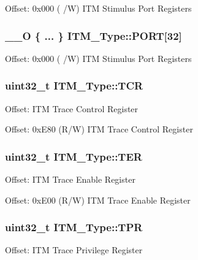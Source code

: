 Offset\-: 0x000 ( /\-W) I\-T\-M Stimulus Port Registers \hypertarget{struct_i_t_m___type_a98d0116d15de5f5633d34fdf594b853e}{
\subsubsection[{P\-O\-R\-T}]{\setlength{\rightskip}{0pt plus 5cm}\-\_\-\-\_\-\-O \{ ... \}    I\-T\-M\-\_\-\-Type\-::\-P\-O\-R\-T\mbox{[}32\mbox{]}}}\label{struct_i_t_m___type_a98d0116d15de5f5633d34fdf594b853e}
Offset\-: 0x000 ( /\-W) I\-T\-M Stimulus Port Registers \hypertarget{struct_i_t_m___type_a58f169e1aa40a9b8afb6296677c3bb45}{
\subsubsection[{T\-C\-R}]{ uint32\-\_\-t I\-T\-M\-\_\-\-Type\-::\-T\-C\-R}}\label{struct_i_t_m___type_a58f169e1aa40a9b8afb6296677c3bb45}
Offset\-: I\-T\-M Trace Control Register

Offset\-: 0x\-E80 (R/\-W) I\-T\-M Trace Control Register \hypertarget{struct_i_t_m___type_a91a040e1b162e1128ac1e852b4a0e589}{
\subsubsection[{T\-E\-R}]{ uint32\-\_\-t I\-T\-M\-\_\-\-Type\-::\-T\-E\-R}}\label{struct_i_t_m___type_a91a040e1b162e1128ac1e852b4a0e589}
Offset\-: I\-T\-M Trace Enable Register

Offset\-: 0x\-E00 (R/\-W) I\-T\-M Trace Enable Register \hypertarget{struct_i_t_m___type_a93b480aac6da620bbb611212186d47fa}{
\subsubsection[{T\-P\-R}]{ uint32\-\_\-t I\-T\-M\-\_\-\-Type\-::\-T\-P\-R}}\label{struct_i_t_m___type_a93b480aac6da620bbb611212186d47fa}
Offset\-: I\-T\-M Trace Privilege Register

